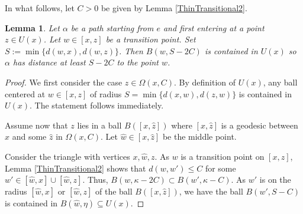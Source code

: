 \documentclass{amsart}
\newtheorem{lem}[thm]{Lemma}
\theoremstyle{definition}
\theoremstyle{remark}
\begin{document}
 In what follows, let $C>0$ be given by Lemma \ref{ThinTransitional2}. 
\begin{lem}\label{AvoidBallLem}
Let $\alpha$ be a path starting from $e$ and first entering  at a point $z\in U(x)$. Let $ w\in [x,z]$ be a transition point.    Set $S:=\min\{d(w,x), d( w, z)\}$. Then $B(w, S-2C)$ is contained in $U(x)$ so $\alpha$ has distance at least $S-2C$ to   the point $w$.     
\end{lem}
\begin{proof}
We first consider the case $z\in \Omega(x,C)$. By definition of $U(x)$,  any ball centered at $w\in [x,z]$ of radius $S=\min\{d(x,w), d(z,w)\}$ is contained in $ U(x)$. The statement follows immediately.  

Assume now that $z$  lies in a ball $B([x,\hat z])$ where $[x,\hat z]$ is a geodesic between $x$ and  some $\hat z$ in $\Omega(x,C)$. Let  $\hat w\in [x,\hat z]$    be the middle point.

Consider the triangle with vertices $x,\hat w,z$. As $w$ is a transition point on $[x,z]$, Lemma \ref{ThinTransitional2}  shows that $d(w, w')\le C$ for some $w'\in [\hat w,x]\cup[\hat w, z]$. Thus, $B(w, \kappa-2C)\subset B(w', \kappa-C)$. As $w'$ is on the radius $[\hat w,x]$ or $[\hat w, z]$ of the ball $B([x,\hat z])$,   we have the ball $B(w', S-C)$ is contained in $B(\hat w, \eta)\subseteq U(x)$. 
\end{proof}
\end{document}
